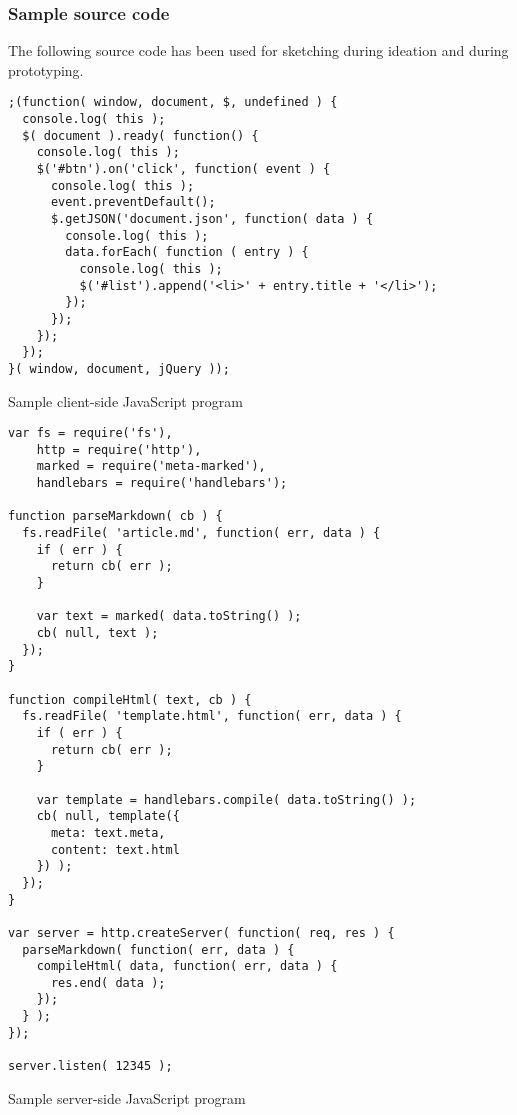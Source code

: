 \subsubsection*{Sample source code}
\label{app:diagram}
The following source code has been used for sketching during ideation and during prototyping.

\begin{listing}[H]
\begin{verbatim}
;(function( window, document, $, undefined ) {
  console.log( this );
  $( document ).ready( function() {
    console.log( this );
    $('#btn').on('click', function( event ) {
      console.log( this );
      event.preventDefault();
      $.getJSON('document.json', function( data ) {
        console.log( this );
        data.forEach( function ( entry ) {
          console.log( this );
          $('#list').append('<li>' + entry.title + '</li>');
        });
      });
    });
  });
}( window, document, jQuery ));
\end{verbatim}
\caption{Sample client-side JavaScript program}
\label{lst:client}
\end{listing}

\begin{listing}[H]
\begin{verbatim}
var fs = require('fs'),
    http = require('http'),
    marked = require('meta-marked'),
    handlebars = require('handlebars');

function parseMarkdown( cb ) {
  fs.readFile( 'article.md', function( err, data ) {
    if ( err ) {
      return cb( err );
    }

    var text = marked( data.toString() );
    cb( null, text );
  });
}

function compileHtml( text, cb ) {
  fs.readFile( 'template.html', function( err, data ) {
    if ( err ) {
      return cb( err );
    }

    var template = handlebars.compile( data.toString() );
    cb( null, template({
      meta: text.meta,
      content: text.html
    }) );
  });
}

var server = http.createServer( function( req, res ) {
  parseMarkdown( function( err, data ) {
    compileHtml( data, function( err, data ) {
      res.end( data );
    });
  } );
});

server.listen( 12345 );
\end{verbatim}
\caption{Sample server-side JavaScript program}
\label{lst:server}
\end{listing}
